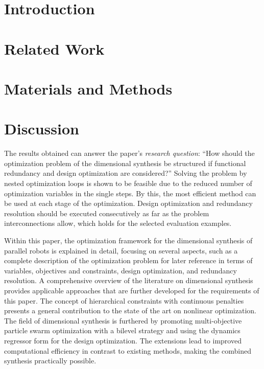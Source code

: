 \documentclass[robotics,article,accept,pdftex,oneauthor]{Definitions/mdpi}
\begin{document}
%

\section{Introduction}



\section{Related Work}




%
\section{Materials and Methods}




%
%





%
\section{Discussion}
\label{sec:discussion}

%


%

%
The results obtained can answer the paper's \emph{research question}: ``How should the optimization problem of the dimensional synthesis be structured if functional redundancy and design optimization are considered?''
%
Solving the problem by nested optimization loops is shown to be feasible due to the reduced number of optimization variables in the single steps.
By this, the most efficient method can be used at each stage of the optimization.
Design optimization and redundancy resolution should be executed consecutively as far as the problem interconnections allow, which holds for the selected evaluation examples. 
%



%



Within this paper, the optimization framework for the dimensional synthesis of parallel robots is explained in detail, focusing on several aspects, {such as a complete description of the optimization problem for later reference in terms of variables, objectives and constraints,} design optimization, and redundancy resolution.
{A comprehensive overview of the literature on dimensional synthesis provides applicable approaches that are further developed for the requirements of this paper.}
%
{The concept of} hierarchical constraints with continuous penalties {presents a general contribution to the state of the art on nonlinear optimization.}
{The field of dimensional synthesis is furthered by promoting} multi-objective particle swarm optimization {with a bilevel strategy} and using the dynamics regressor form for the design optimization.
The extensions lead to improved computational efficiency in contrast to existing methods, {making the combined synthesis practically possible.}
\end{document}
